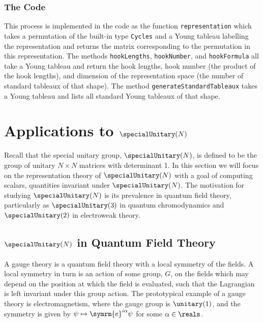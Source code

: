 \documentclass[fleqn]{NotesClass}
\newcommand{\e}{\symrm{e}}
\begin{document}
    \subsection{The Code}
    This process is implemented in the code as the function \lstinline|representation| which takes a permutation of the built-in type \lstinline|Cycles| and a Young tableau labelling the representation and returns the matrix corresponding to the permutation in this representation.
    The methods \lstinline|hookLengths|, \lstinline|hookNumber|, and \lstinline|hookFormula| all take a Young tableau and return the hook lengths, hook number (the product of the hook lengths), and dimension of the representation space (the number of standard tableaux of that shape).
    The method \lstinline|generateStandardTableaux| takes a Young tableau and lists all standard Young tableaux of that shape.
    
    \chapter{Applications to \texorpdfstring{\(\specialUnitary(N)\)}{SU(N)}}
    Recall that the special unitary group, \(\specialUnitary(N)\), is defined to be the group of unitary \(N \times N\) matrices with determinant 1.
    In this section we will focus on the representation theory of \(\specialUnitary(N)\) with a goal of computing scalars, quantities invariant under \(\specialUnitary(N)\).
    The motivation for studying \(\specialUnitary(N)\) is its prevalence in quantum field theory, particularly as \(\specialUnitary(3)\) in quantum chromodynamics and \(\specialUnitary(2)\) in electroweak theory.
    
    \section{\texorpdfstring{\(\specialUnitary(N)\)}{SU(N)} in Quantum Field Theory}
    A gauge theory is a quantum field theory with a local symmetry of the fields.
    A local symmetry in turn is an action of some group, \(G\), on the fields which may depend on the position at which the field is evaluated, such that the Lagrangian is left invariant under this group action.
    The prototypical example of a gauge theory is electromagnetism, where the gauge group is \(\unitary(1)\), and the symmetry is given by \(\psi \mapsto \e^{i\alpha}\psi\) for some \(\alpha \in \reals\).
    
\end{document}
